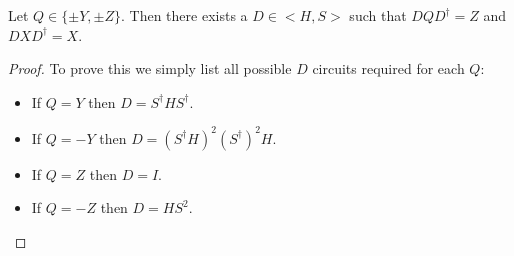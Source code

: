 \documentclass[12pt]{dalthesis}
\begin{document}
\begin{lemma}
\label{ConjZ}
Let $Q \in \{\pm Y, \pm Z \}$. Then there exists a $D \in <H, S>$ such that $DQD^\dag = Z$ and $DXD^\dag = X$.
\end{lemma}
\begin{proof}
To prove this we simply list all possible $D$ circuits required for each $Q$:
\begin{itemize}
\item If $Q = Y$ then $D = S^\dag HS^\dag$.
\item If $Q = -Y$ then $D = (S^\dag H)^2 (S^\dag)^2 H$.
\item If $Q = Z$ then $D = I$.
\item If $Q = -Z$ then $D = HS^2$.
\end{itemize}
\end{proof}
\end{document}

